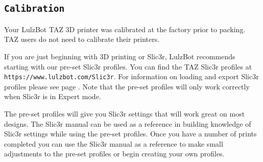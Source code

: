 
\subsection{\texttt{Calibration}}
\label{calibration}

Your LulzBot\textsuperscript{\miniscule{\texttrademark}} TAZ 3D printer was calibrated at the factory prior to packing. TAZ users do not need to calibrate their printers. 


If you are just beginning with 3D printing or Slic3r, LulzBot\textsuperscript{\miniscule{\texttrademark}} recommends starting with our pre-set Slic3r profiles. You can find the TAZ Slic3r profiles at \texttt{https://www.lulzbot.com/Slic3r}. For information on loading and export Slic3r profiles please see page \pageref{sub:exporting_and_importing_configuration}. Note that the pre-set profiles will only work correctly when Slic3r is in Expert mode.

The pre-set profiles will give you Slic3r settings that will work great on most designs. The Slic3r manual can be used as a reference in building knowledge of Slic3r settings while using the pre-set profiles. Once you have a number of prints completed you can use the Slic3r manual as a reference to make small adjustments to the pre-set profiles or begin creating your own profiles.
